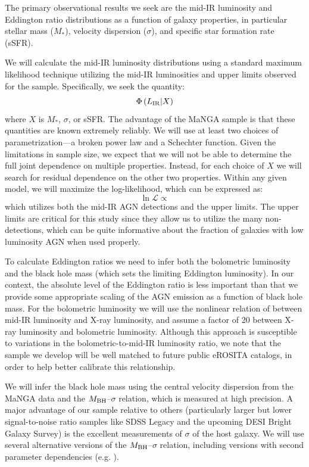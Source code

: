 \documentclass[12pt, preprint]{hacked-aastex}
\begin{document}
The primary observational results we seek are the mid-IR luminosity
and Eddington ratio distributions as a function of galaxy properties,
in particular stellar mass ($M_\ast$), velocity dispersion ($\sigma$),
and specific star formation rate (sSFR).

We will calculate the mid-IR luminosity distributions using a standard
maximum likelihood technique utilizing the mid-IR luminosities and
upper limits observed for the sample. Specifically, we seek the
quantity:
\begin{equation}
\Phi\left(L_{\rm IR} | X\right)
\end{equation}
where $X$ is $M_\ast$, $\sigma$, or sSFR. The advantage of the MaNGA
sample is that these quantities are known extremely reliably. We will
use at least two choices of parametrization---a broken power law and a
Schechter function. Given the limitations in sample size, we expect
that we will not be able to determine the full joint dependence on
multiple properties. Instead, for each choice of $X$ we will search
for residual dependence on the other two properties. Within any given
model, we will maximize the log-likelihood, which can be expressed as:
\begin{equation}
\ln \mathcal{L} \propto 
\end{equation}
which utilizes both the mid-IR AGN detections and the upper
limits. The upper limits are critical for this study since they allow
us to utilize the many non-detections, which can be quite informative
about the fraction of galaxies with low luminosity AGN when used
properly.

To calculate Eddington ratios we need to infer both the bolometric
luminosity and the black hole mass (which sets the limiting Eddington
luminosity). In our context, the absolute level of the Eddington ratio
is less important than that we provide some appropriate scaling of the
AGN emission as a function of black hole mass.  For the bolometric
luminosity we will use the nonlinear relation of \cite{stern15a}
between mid-IR luminosity and X-ray luminosity, and assume a factor of
20 between X-ray luminosity and bolometric luminosity. Although this
approach is susceptible to variations in the bolometric-to-mid-IR
luminosity ratio, we note that the sample we develop will be well
matched to future public eROSITA catalogs, in order to help better
calibrate this relationship.

We will infer the black hole mass using the central velocity
dispersion from the MaNGA data and the $M_{\rm BH}$--$\sigma$
relation, which is measured at high precision.  A major advantage of
our sample relative to others (particularly larger but lower
signal-to-noise ratio samples like SDSS Legacy and the upcoming DESI
Bright Galaxy Survey) is the excellent measurements of $\sigma$ of the
host galaxy. We will use several alternative versions of the $M_{\rm
  BH}$--$\sigma$ relation, including versions with second parameter
dependencies (e.g. \cite{kormendy13a, vandenbosch16a}).
\end{document}
